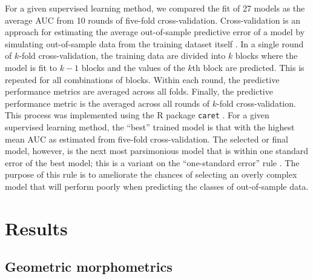 \documentclass[10pt,letterpaper]{article}
\begin{document}
For a given supervised learning method, we compared the fit of 27 models as the average AUC from 10 rounds of five-fold cross-validation. Cross-validation is an approach for estimating the average out-of-sample predictive error of a model by simulating out-of-sample data from the training dataset itself \cite{Hastie2009}. In a single round of \(k\)-fold cross-validation, the training data are divided into \(k\) blocks where the model is fit to \(k - 1\) blocks and the values of the \(k\)th block are predicted. This is repeated for all combinations of blocks. Within each round, the predictive performance metrics are averaged across all folds. Finally, the predictive performance metric is the averaged across all rounds of \(k\)-fold cross-validation. This process was implemented using the R package \texttt{caret} \cite{KuhnMAN2013}. For a given supervised learning method, the ``best'' trained model is that with the highest mean AUC as estimated from five-fold cross-validation. The selected or final model, however, is the next most parsimonious model that is within one standard error of the best model; this is a variant on the ``one-standard error'' rule \cite{Hastie2009}. The purpose of this rule is to ameliorate the chances of selecting an overly complex model that will perform poorly when predicting the classes of out-of-sample data.






\section*{Results}

\subsection*{Geometric morphometrics}
\end{document}
